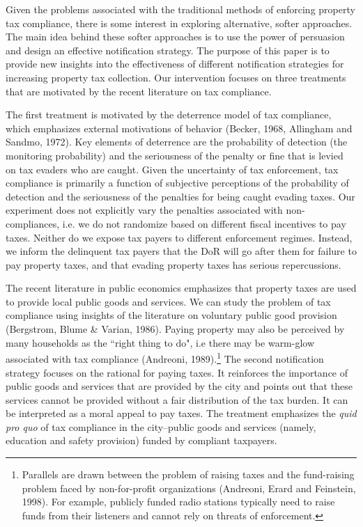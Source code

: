 \documentclass[12pt,titlepage]{article}
\begin{document}
Given the problems associated with the traditional methods of
enforcing property tax compliance, there is some interest in exploring
alternative, softer approaches. The main idea behind these softer
approaches is to use the power of persuasion and design an effective
notification strategy. The purpose of this paper is to provide new
insights into the effectiveness of different notification strategies
for increasing property tax collection. Our intervention focuses on
three treatments that are motivated by the recent literature on tax
compliance.

The first treatment is motivated by the deterrence model of tax
compliance, which emphasizes external motivations of behavior (Becker,
1968, Allingham and Sandmo, 1972). Key elements of deterrence are the
probability of detection (the monitoring probability) and the
seriousness of the penalty or fine that is levied on tax evaders who
are caught.  Given the uncertainty of tax enforcement, tax compliance
is primarily a function of subjective perceptions of the probability
of detection and the seriousness of the penalties for being caught
evading taxes. Our experiment does not explicitly vary the penalties
associated with non-compliances, i.e. we do not randomize based on
different fiscal incentives to pay taxes.  Neither do we expose tax
payers to different enforcement regimes.  Instead, we inform the
delinquent tax payers that the DoR will go after them for failure to
pay property taxes, and that evading property taxes has serious
repercussions.

The recent literature in public economics emphasizes that property
taxes are used to provide local public goods and services. We can
study the problem of tax compliance using insights of the literature
on voluntary public good provision (Bergstrom, Blume \& Varian,
1986). Paying property may also be perceived by many households as the
``right thing to do", i.e there may be warm-glow associated with tax
compliance (Andreoni, 1989).\footnote{ Parallels are drawn between the
  problem of raising taxes and the fund-raising problem faced by
  non-for-profit organizations (Andreoni, Erard and Feinstein,
  1998). For example, publicly funded radio stations typically need to
  raise funds from their listeners and cannot rely on threats of
  enforcement.}  The second notification strategy focuses on the
rational for paying taxes. It reinforces the importance of public
goods and services that are provided by the city and points out that
these services cannot be provided without a fair distribution of the
tax burden. It can be interpreted as a moral appeal to pay taxes. The
treatment emphasizes the \textit{quid pro quo} of tax compliance in
the city--public goods and services (namely, education and safety
provision) funded by compliant taxpayers.
\end{document}

